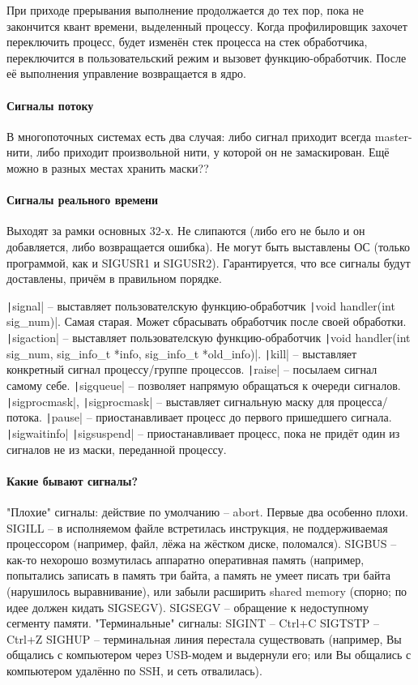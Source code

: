 \documentclass[a4paper,10pt]{article}
\newcommand{\ci}{\texttt}
\begin{document}
При приходе прерывания выполнение продолжается до тех пор, пока не закончится квант времени, выделенный процессу. 
Когда профилировщик захочет переключить процесс, будет изменён стек процесса на стек обработчика, переключится в пользовательский режим и вызовет функцию-обработчик. После её выполнения управление возвращается в ядро.

\paragraph{Сигналы потоку}
В многопоточных системах есть два случая: либо сигнал приходит всегда master-нити, либо приходит произвольной нити, у которой он не замаскирован.
Ещё можно в разных местах хранить маски??

\paragraph{Сигналы реального времени}
Выходят за рамки основных 32-х. Не слипаются (либо его не было и он добавляется, либо возвращается ошибка). Не могут быть выставлены ОС (только программой, как и SIGUSR1 и SIGUSR2).
Гарантируется, что все сигналы будут доставлены, причём в правильном порядке.

\ci|signal| -- выставляет пользователскую функцию-обработчик  \ci|void handler(int sig_num)|. Самая старая. Может сбрасывать обработчик после своей обработки.
\ci|sigaction| -- выставляет пользователскую функцию-обработчик  \ci|void handler(int sig_num, sig_info_t *info, sig_info_t *old_info)|.
\ci|kill| -- выставляет конкретный сигнал процессу/группе процессов.
\ci|raise| -- посылаем сигнал самому себе.
\ci|sigqueue| -- позволяет напрямую обращаться к очереди сигналов.
\ci|sigprocmask|, \ci|sigprocmask| -- выставляет сигнальную маску для процесса/потока.
\ci|pause| -- приостанавливает процесс до первого пришедшего сигнала.
\ci|sigwaitinfo|
\ci|sigsuspend| -- приостанавливает процесс, пока не придёт один из сигналов не из маски, переданной процессу.

\paragraph{Какие бывают сигналы?}
"Плохие" сигналы: действие по умолчанию -- abort. Первые два особенно плохи.
SIGILL -- в исполняемом файле встретилась инструкция, не поддерживаемая процессором (например, файл, лёжа на жёстком диске, поломался).
SIGBUS -- как-то нехорошо возмутилась аппаратно оперативная память (например, попытались записать в память три байта, а память не умеет писать три байта (нарушилось выравнивание), или забыли расширить shared memory (спорно; по идее должен кидать SIGSEGV).
SIGSEGV -- обращение к недоступному сегменту памяти.
"Терминальные" сигналы:
SIGINT -- Ctrl+C
SIGTSTP -- Ctrl+Z
SIGHUP -- терминальная линия перестала существовать (например, Вы общались с компьютером через USB-модем и выдернули его; или Вы общались с компьютером удалённо по SSH, и сеть отвалилась).
\end{document}
